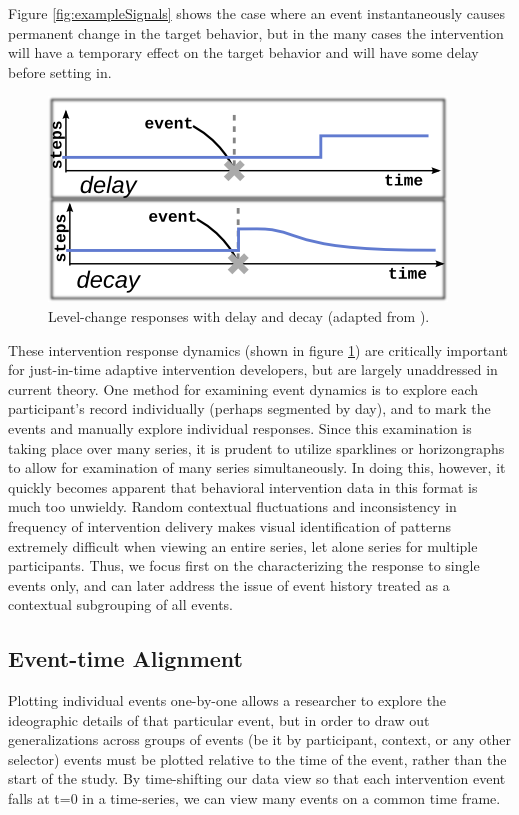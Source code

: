 Figure \ref{fig:exampleSignals} shows the case where an event instantaneously causes permanent change in the target behavior, but in the many cases the intervention will have a temporary effect on the target behavior and will have some delay before setting in.

\begin{figure}
\centering
\includegraphics[width=0.6\columnwidth]{./img/exampleDynamicComplications.png}
\caption{Level-change responses with delay and decay (adapted from \cite{glass1975}).}
\label{fig:exampleComplications}
\end{figure}

These intervention response dynamics (shown in figure \ref{fig:exampleComplications}) are critically important for just-in-time adaptive intervention developers, but are largely unaddressed in current theory.
One method for examining event dynamics is to explore each participant's record individually (perhaps segmented by day), and to mark the events and manually explore individual responses.
Since this examination is taking place over many series, it is prudent to utilize sparklines \cite{tufte2006} or horizongraphs \cite{reijner2008} to allow for examination of many series simultaneously.
In doing this, however, it quickly becomes apparent that behavioral intervention data in this format is much too unwieldy.
Random contextual fluctuations and inconsistency in frequency of intervention delivery makes visual identification of patterns extremely difficult when viewing an entire series, let alone series for multiple participants. 
Thus, we focus first on the characterizing the response to single events only, and can later address the issue of event history treated as a contextual subgrouping of all events.

\subsection{Event-time Alignment}
Plotting individual events one-by-one allows a researcher to explore the ideographic details of that particular event, but in order to draw out generalizations across groups of events (be it by participant, context, or any other selector) events must be plotted relative to the time of the event, rather than the start of the study.
By time-shifting our data view so that each intervention event falls at t=0 in a time-series, we can view many events on a common time frame.

